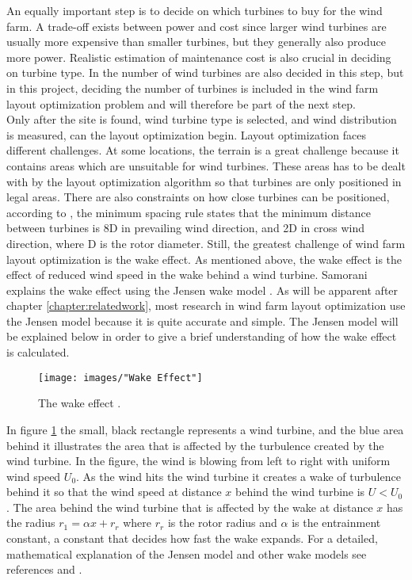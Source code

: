 \noindent An equally important step is to decide on which turbines to buy for the wind farm. A trade-off exists between power and cost since larger wind turbines are usually more expensive than smaller turbines, but they generally also produce more power. Realistic estimation of maintenance cost is also crucial in deciding on turbine type. In \cite{Samorani} the number of wind turbines are also decided in this step, but in this project, deciding the number of turbines is included in the wind farm layout optimization problem and will therefore be part of the next step. \\

\noindent Only after the site is found, wind turbine type is selected, and wind distribution is measured, can the layout optimization begin. Layout optimization faces different challenges. At some locations, the terrain is a great challenge because it contains areas which are unsuitable for wind turbines. These areas has to be dealt with by the layout optimization algorithm so that turbines are only positioned in legal areas. There are also constraints on how close turbines can be positioned, according to \cite{Sisbot}, the minimum spacing rule states that the minimum distance between turbines is 8D in prevailing wind direction, and 2D in cross wind direction, where D is the rotor diameter. Still, the greatest challenge of wind farm layout optimization is the wake effect. As mentioned above, the wake effect is the effect of reduced wind speed in the wake behind a wind turbine. Samorani explains the wake effect using the Jensen wake model \citep{Jensen}. As will be apparent after chapter \ref{chapter:relatedwork}, most research in wind farm layout optimization use the Jensen model because it is quite accurate and simple. The Jensen model will be explained below in order to give a brief understanding of how the wake effect is calculated. \\

\begin{figure}[h!]
\begin{center}
\texttt{[image: images/"Wake Effect"]}
\caption{The wake effect \citep{Samorani}.}
\label{Wake effect}
\end{center}
\end{figure}

\noindent In figure \ref{Wake effect} the small, black rectangle represents a wind turbine, and the blue area behind it illustrates the area that is affected by the turbulence created by the wind turbine. In the figure, the wind is blowing from left to right with uniform wind speed $U_0$. As the wind hits the wind turbine it creates a wake of turbulence behind it so that the wind speed at distance $x$ behind the wind turbine is $U < U_0$. The area behind the wind turbine that is affected by the wake at distance $x$ has the radius $r_1 = \alpha x + r_r$ where $r_r$ is the rotor radius and $\alpha$ is the entrainment constant, a constant that decides how fast the wake expands. For a detailed, mathematical explanation of the Jensen model and other wake models see references \citep{Jensen} and \citep{Liang}.\\

